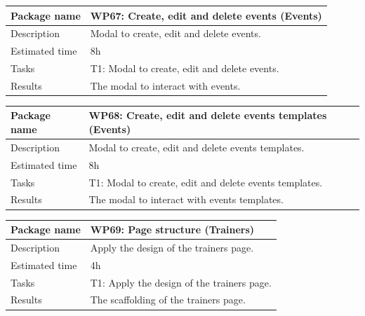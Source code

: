 \documentclass[a4paper, 12pt, oneside]{book}
\begin{document}
\vspace*{16pt}
\begin{tabularx}{\textwidth}{| l | X |}
	\hline
	\rowcolor{rowColor}
	{\semibf Package name}   & {\semibf WP67}: Create, edit and delete events (Events) \\
	\hline
	{\semibf Description}    & Modal to create, edit and delete events.                \\
	\hline
	\rowcolor{rowColor}
	{\semibf Estimated time} & 8h                                                      \\
	\hline
	{\semibf Tasks}          & {\semibf T1}: Modal to create, edit and delete events.  \\
	\hline
	\rowcolor{rowColor}
	{\semibf Results}        & The modal to interact with events.                      \\
	\hline
\end{tabularx}
\vspace*{16pt}
\begin{tabularx}{\textwidth}{| l | X |}
	\hline
	\rowcolor{rowColor}
	{\semibf Package name}   & {\semibf WP68}: Create, edit and delete events templates (Events) \\
	\hline
	{\semibf Description}    & Modal to create, edit and delete events templates.                \\
	\hline
	\rowcolor{rowColor}
	{\semibf Estimated time} & 8h                                                                \\
	\hline
	{\semibf Tasks}          & {\semibf T1}: Modal to create, edit and delete events templates.  \\
	\hline
	\rowcolor{rowColor}
	{\semibf Results}        & The modal to interact with events templates.                      \\
	\hline
\end{tabularx}
\vspace*{16pt}
\begin{tabularx}{\textwidth}{| l | X |}
	\hline
	\rowcolor{rowColor}
	{\semibf Package name}   & {\semibf WP69}: Page structure (Trainers)            \\
	\hline
	{\semibf Description}    & Apply the design of the trainers page.               \\
	\hline
	\rowcolor{rowColor}
	{\semibf Estimated time} & 4h                                                   \\
	\hline
	{\semibf Tasks}          & {\semibf T1}: Apply the design of the trainers page. \\
	\hline
	\rowcolor{rowColor}
	{\semibf Results}        & The scaffolding of the trainers page.                \\
	\hline
\end{tabularx}
\end{document}
